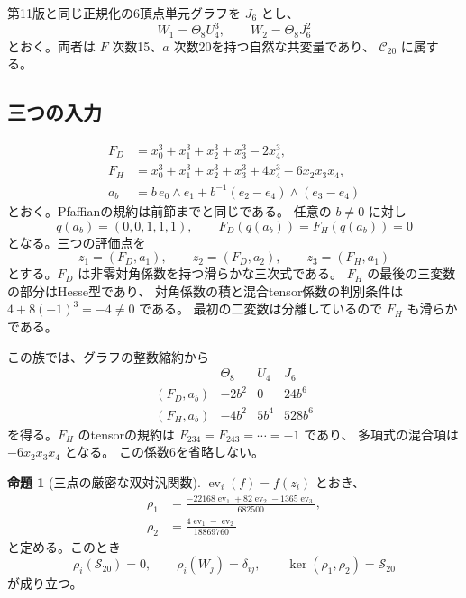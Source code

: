 \documentclass[a4paper,11pt]{ltjsarticle}
\theoremstyle{definition}
\newtheorem{proposition}[theorem]{命題}
\begin{document}
第11版と同じ正規化の6頂点単元グラフを $J_6$ とし、
\[
 W_1=\Theta_8U_4^3,\qquad W_2=\Theta_8J_6^2
\]
とおく。両者は $F$ 次数15、$a$ 次数20を持つ自然な共変量であり、
$\mathcal C_{20}$ に属する。

\subsection{三つの入力}

\begin{align*}
 F_D&=x_0^3+x_1^3+x_2^3+x_3^3-2x_4^3,\\
 F_H&=x_0^3+x_1^3+x_2^3+x_3^3+4x_4^3-6x_2x_3x_4,\\
 a_b&=b\,e_0\wedge e_1
       +b^{-1}(e_2-e_4)\wedge(e_3-e_4)
\end{align*}
とおく。Pfaffianの規約は前節までと同じである。
任意の $b\ne0$ に対し
\[
 q(a_b)=(0,0,1,1,1),\qquad F_D(q(a_b))=F_H(q(a_b))=0
\]
となる。三つの評価点を
\[
 z_1=(F_D,a_1),\qquad z_2=(F_D,a_2),\qquad z_3=(F_H,a_1)
\]
とする。$F_D$ は非零対角係数を持つ滑らかな三次式である。
$F_H$ の最後の三変数の部分はHesse型であり、
対角係数の積と混合tensor係数の判別条件は $4+8(-1)^3=-4\ne0$ である。
最初の二変数は分離しているので $F_H$ も滑らかである。

この族では、グラフの整数縮約から
\[
\begin{array}{c|ccc}
 &\Theta_8&U_4&J_6\\\hline
(F_D,a_b)&-2b^2&0&24b^6\\
(F_H,a_b)&-4b^2&5b^4&528b^6
\end{array}
\]
を得る。$F_H$ のtensorの規約は
$F_{234}=F_{243}=\cdots=-1$ であり、
多項式の混合項は $-6x_2x_3x_4$ となる。
この係数6を省略しない。

\begin{proposition}[三点の厳密な双対汎関数]
\label{prop:v15-exact-dual-detectors}
$\operatorname{ev}_i(f)=f(z_i)$ とおき、
\begin{align}
 \rho_1&=\frac{-22168\operatorname{ev}_1+82\operatorname{ev}_2
                    -1365\operatorname{ev}_3}{682500},
                    \label{eq:v15-rho1}\\
 \rho_2&=\frac{4\operatorname{ev}_1-\operatorname{ev}_2}{18869760}
                    \label{eq:v15-rho2}
\end{align}
と定める。このとき
\[
 \rho_i(\mathcal S_{20})=0,\qquad
 \rho_i(W_j)=\delta_{ij},\qquad
 \ker(\rho_1,\rho_2)=\mathcal S_{20}
\]
が成り立つ。
\end{proposition}
\end{document}
